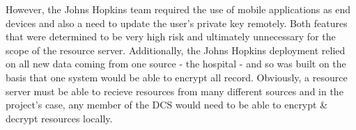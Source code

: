 However, the Johns Hopkins team required the use of mobile applications as end devices and also a need to update the user's private key remotely. Both features that were determined to be very high risk and ultimately unnecessary for the scope of the resource server. Additionally, the Johns Hopkins deployment relied on all new data coming from one source - the hospital - and so was built on the basis that one system would be able to encrypt all record. Obviously, a resource server must be able to recieve resources from many different sources and in the project's case, any member of the DCS would need to be able to encrypt \& decrypt resources locally.
